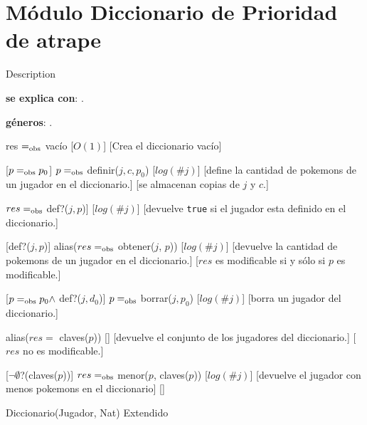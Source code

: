 \section{Módulo Diccionario de Prioridad de atrape}
	Description %

\begin{Interfaz}
	\textbf{se explica con}: . 

	\textbf{géneros}: .


	{res $=_{\mathrm{obs}}$ vacío}
	[$O(1)$]
	[Crea el diccionario vacío]

	[$p =_{\mathrm{obs}} p_0$]
	{$p =_{\mathrm{obs}}$ definir($j, c, p_0$)}
	[$log(\#j)$]
	[define la cantidad de pokemons de un jugador en el diccionario.]
	[se almacenan copias de $j$ y $c$.]

	{$res =_{\mathrm{obs}}$ def?($j, p$)]}
	[$log(\#j)$]
	[devuelve \texttt{true} si el jugador esta definido en el diccionario.]

	[def?($j, p$)]
	{alias($res =_{\mathrm{obs}}$ obtener($j$, $p$))}
	[$log(\#j)$]
	[devuelve la cantidad de pokemons de un jugador en el diccionario.]
	[$res$ es modificable si y sólo si $p$ es modificable.]

	[$p =_{\mathrm{obs}} p_0 \land$ def?($j, d_0$)]
	{$p =_{\mathrm{obs}}$ borrar($j, p_0$)}
	[$log(\#j)$]
	[borra un jugador del diccionario.]

	{alias($res =$ claves($p$))}
	[]%
	[devuelve el conjunto de los jugadores del diccionario.]
	[$res$ no es modificable.]

	[$\neg\emptyset$?(claves($p$))]
	{$res =_{\mathrm{obs}}$ menor($p$, claves($p$))}
	[$log(\#j)$]
	[devuelve el jugador con menos pokemons en el diccionario]
	[]


  \begin{tad}{Diccionario(Jugador, Nat) Extendido}
    \parskip=0pt
    
    \tadAxiomas
  \end{tad}

\end{Interfaz}


